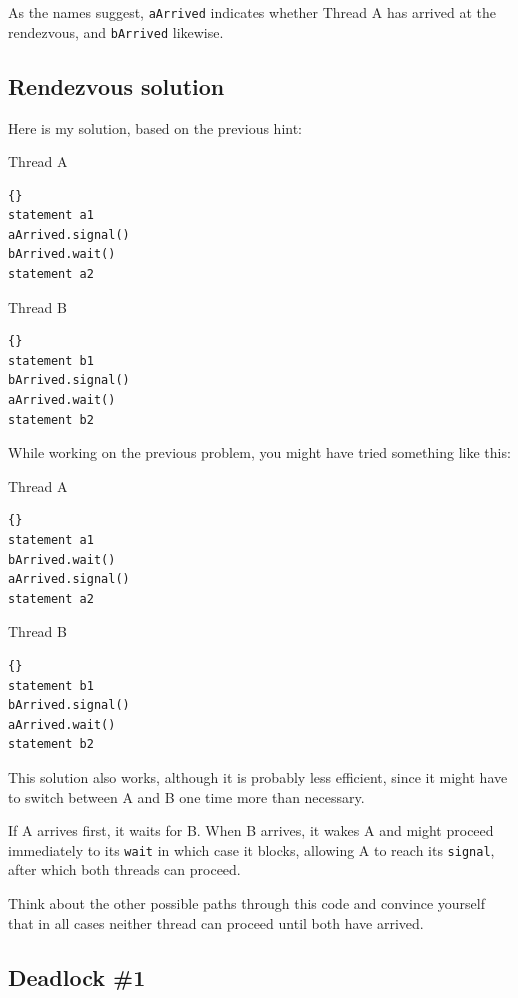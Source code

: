 \documentclass{book}
\newcommand{\clearemptydoublepage}{\newpage\cleardoublepage}
\begin{document}
As the names suggest, {\tt aArrived} indicates whether Thread A
has arrived at the rendezvous, and {\tt bArrived} likewise.

\clearemptydoublepage
\subsection{Rendezvous solution}

Here is my solution, based on the previous hint:

\begin{minipage}[t]{2in}
Thread A
\begin{lstlisting}{}
statement a1
aArrived.signal()
bArrived.wait()
statement a2
\end{lstlisting}
\end{minipage}
\hfill
\begin{minipage}[t]{2in}
Thread B
\begin{lstlisting}{}
statement b1
bArrived.signal()
aArrived.wait()
statement b2
\end{lstlisting}
\end{minipage}

While working on the previous problem, you might have
tried something like this:

\begin{minipage}[t]{2in}
Thread A
\begin{lstlisting}{}
statement a1
bArrived.wait()
aArrived.signal()
statement a2
\end{lstlisting}
\end{minipage}
\hfill
\begin{minipage}[t]{2in}
Thread B
\begin{lstlisting}{}
statement b1
bArrived.signal()
aArrived.wait()
statement b2
\end{lstlisting}
\end{minipage}

This solution also works, although it is probably less
efficient, since it might have to switch between A and B
one time more than necessary.

If A arrives first, it waits for B.  When B arrives, it wakes
A and might proceed immediately to its {\tt wait} in which
case it blocks, allowing A to reach its {\tt signal}, after
which both threads can proceed.

Think about the other possible paths through this code and
convince yourself that in all cases neither thread can
proceed until both have arrived.

\subsection {Deadlock \#1}
\end{document}
